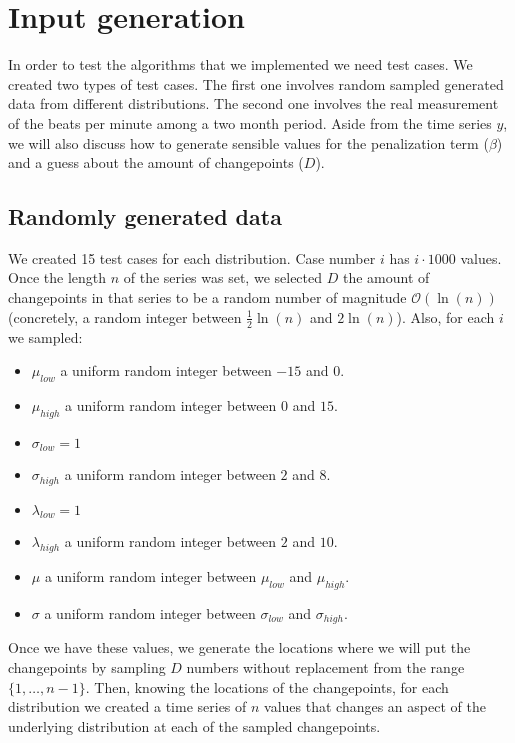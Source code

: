 \documentclass[pdflatex,sn-mathphys]{sn-jnl}%
\theoremstyle{thmstyleone}%
\theoremstyle{thmstyletwo}%
\theoremstyle{thmstylethree}%
\begin{document}
\section{Input generation}\label{input}

In order to test the algorithms that we implemented we need test cases. We created two types of test cases. The first one involves random sampled generated data from different distributions. The second one involves the real measurement of the beats per minute among a two month period. Aside from the time series $y$, we will also discuss how to generate sensible values for the penalization term ($\beta$) and a guess about the amount of changepoints ($D$).

\subsection{Randomly generated data}

We created 15 test cases for each distribution. Case number $i$ has $i\cdot 1000$ values. Once the length $n$ of the series was set, we selected $D$ the amount of changepoints in that series to be a random number of magnitude $\mathcal{O}(\ln(n))$ (concretely, a random integer between $\frac{1}{2}\ln(n)$ and $2\ln(n)$). Also, for each $i$ we sampled:
\begin{itemize}
    \item $\mu_{low}$ a uniform random integer between $-15$ and $0$.
    \item $\mu_{high}$ a uniform random integer between $0$ and $15$.
    \item $\sigma_{low} = 1$ 
    \item $\sigma_{high}$ a uniform random integer between $2$ and $8$.
    \item $\lambda_{low} = 1$ 
    \item $\lambda_{high}$ a uniform random integer between $2$ and $10$.
    \item $\mu$ a uniform random integer between $\mu_{low}$ and $\mu_{high}$.
    \item $\sigma$ a uniform random integer between $\sigma_{low}$ and $\sigma_{high}$.
\end{itemize}

Once we have these values, we generate the locations where we will put the changepoints by sampling $D$ numbers without replacement from the range $\{1, \dots, n-1\}$. Then, knowing the locations of the changepoints, for each distribution we created a time series of $n$ values that changes an aspect of the underlying distribution at each of the sampled changepoints.
\end{document}
